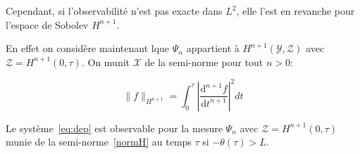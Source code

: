 \documentclass[a4paper]{article}
\begin{document}
Cependant, si l'observabilité n'est pas exacte dans $L^2$, elle l'est en revanche pour l'espace de Sobolev $H^{n+1}$. 

En effet on considère maintenant lque $\Psi_n$ appartient à $H^{n+1}(\mathscr{Y},\mathscr{Z})$ avec $\mathscr{Z}=H^{n+1}(0,\tau)$. 
On munit $\mathscr{X}$ de la semi-norme pour tout $n>0$:

\begin{equation}
	\label{normH}
	\|f \|_{H^{n+1} } = \int_0^{\tau} |\frac{\mathrm{d}^{n+1}f}{\mathrm{d}t^{n+1}}|^2 dt
\end{equation}


\begin{proposition}
	Le système~\eqref{eq:dep} est observable pour la mesure $\Psi_n$ avec $\mathscr{Z}=H^{n+1}(0,\tau)$ munie de la semi-norme~\eqref{normH} au temps $\tau$ si $ -\theta(\tau) > L$.
\end{proposition}
\end{document}
